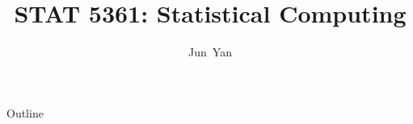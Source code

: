 \documentclass[11pt]{beamer}
\title[STAT 5361]{STAT 5361: Statistical Computing}	%
\author[Jun Yan]{Jun~Yan}
\institute[University of Connecticut]{
  Department of Statistics\\ University of Connecticut
}
\date{} %
\begin{document}
\begin{frame}
\thispagestyle{empty}
  \titlepage
\end{frame}

\begin{frame}[t,allowframebreaks]{Outline}

\begin{small}
\thispagestyle{empty}
  \tableofcontents
\end{small}
\end{frame}









% 

% 

% 

% 

% 

% 

% 

% 

% 


% 
\end{document}
